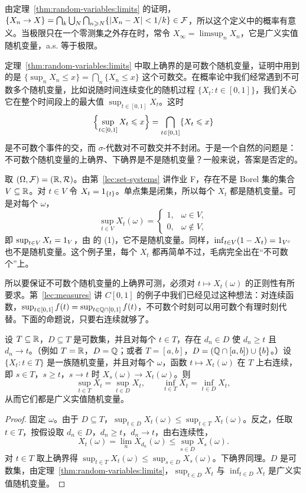 由定理~\ref{thm:random-variables:limits} 的证明，$\{X_n\to X\}=\bigcap_{k}\bigcup_N\bigcap_{n\geqslant N}\{\lvert X_n-X\rvert<1/k\}\in\mathcal{F}$，所以这个定义中的概率有意义。当极限只在一个零测集之外存在时，常令 $X_\infty=\limsup_nX_n$，它是广义实值随机变量，a.s. 等于极限。


定理~\ref{thm:random-variables:limits} 中取上确界的是可数个随机变量，证明中用到的是 $\{\sup_nX_n\leqslant x\}=\bigcap_n\{X_n\leqslant x\}$ 这个可数交。在概率论中我们经常遇到不可数多个随机变量，比如说随时间连续变化的随机过程 $\{X_t:t\in[0,1]\}$，我们关心它在整个时间段上的最大值 $\sup_{t\in[0,1]}X_t$。这时
\[
\Bigl\{\sup_{t\in[0,1]}X_t\leqslant x\Bigr\}=\bigcap_{t\in[0,1]}\{X_t\leqslant x\}
\]
是不可数个事件的交，而 $\sigma$-代数对不可数交并不封闭。于是一个自然的问题是：不可数个随机变量的上确界、下确界是不是随机变量？一般来说，答案是否定的。

\begin{example}[不可数个随机变量的上确界可以不可测]
取 $(\Omega,\mathcal{F})=(\mathbb{R},\mathcal{R})$。由第~\ref{lec:set-systems} 讲作业 F，存在不是 Borel 集的集合 $V\subseteq\mathbb{R}$。对 $t\in V$ 令 $X_t=1_{\{t\}}$。单点集是闭集，所以每个 $X_t$ 都是随机变量。可是对每个 $\omega$，
\[
\sup_{t\in V}X_t(\omega)=\begin{cases}1,&\omega\in V,\\0,&\omega\notin V,\end{cases}
\]
即 $\sup_{t\in V}X_t=1_V$，由 的 (1)，它不是随机变量。同样，$\inf_{t\in V}(1-X_t)=1_{V^c}$ 也不是随机变量。这个例子里，每个 $X_t$ 都再简单不过，毛病完全出在“不可数个”上。
\end{example}

所以要保证不可数个随机变量的上确界可测，必须对 $t\mapsto X_t(\omega)$ 的正则性有所要求。第~\ref{lec:measures} 讲 $C[0,1]$ 的例子中我们已经见过这种想法：对连续函数，$\sup_{t\in[0,1]}f(t)=\sup_{t\in\mathbb{Q}\cap[0,1]}f(t)$，不可数个时刻可以用可数个有理时刻代替。下面的命题说，只要右连续就够了。

\begin{proposition}[右连续时化为可数个]\label{prop:random-variables:sup-right-continuous}
设 $T\subseteq\mathbb{R}$，$D\subseteq T$ 是可数集，并且对每个 $t\in T$，存在 $d_n\in D$ 使 $d_n\geqslant t$ 且 $d_n\to t$。（例如 $T=\mathbb{R}$，$D=\mathbb{Q}$；或者 $T=[a,b]$，$D=(\mathbb{Q}\cap[a,b])\cup\{b\}$。）设 $\{X_t:t\in T\}$ 是一族随机变量，并且对每个 $\omega$，函数 $t\mapsto X_t(\omega)$ 在 $T$ 上右连续，即 $s\in T$，$s\geqslant t$，$s\to t$ 时 $X_s(\omega)\to X_t(\omega)$。则
\[
\sup_{t\in T}X_t=\sup_{t\in D}X_t,\qquad \inf_{t\in T}X_t=\inf_{t\in D}X_t,
\]
从而它们都是广义实值随机变量。
\end{proposition}
\begin{proof}
固定 $\omega$。由于 $D\subseteq T$，$\sup_{t\in D}X_t(\omega)\leqslant\sup_{t\in T}X_t(\omega)$。反之，任取 $t\in T$，按假设取 $d_n\in D$，$d_n\geqslant t$，$d_n\to t$，由右连续性，
\[
X_t(\omega)=\lim_nX_{d_n}(\omega)\leqslant\sup_{s\in D}X_s(\omega).
\]
对 $t\in T$ 取上确界得 $\sup_{t\in T}X_t(\omega)\leqslant\sup_{s\in D}X_s(\omega)$。下确界同理。$D$ 是可数集，由定理~\ref{thm:random-variables:limits}，$\sup_{t\in D}X_t$ 与 $\inf_{t\in D}X_t$ 是广义实值随机变量。
\end{proof}

